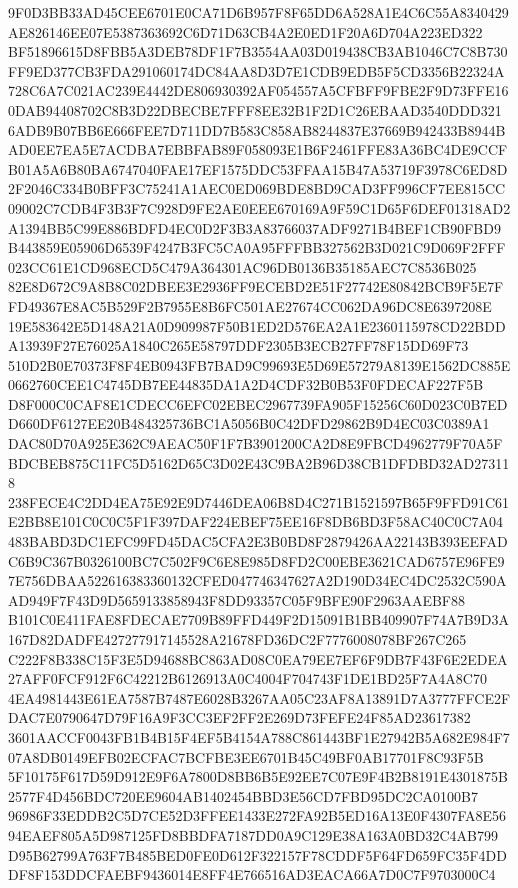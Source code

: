 \documentclass[UTF8,fontset=fandol,zihao=-4,a4paper]{ctexart}
\begin{document}
{{9F0D3BB33AD45CEE6701E0CA71D6B957F8F65DD6A528A1E4C6C55A8340429AE826146EE07E5387363692C6D71D63CB4A2E0ED1F20A6D704A223ED322
BF51896615D8FBB5A3DEB78DF1F7B3554AA03D019438CB3AB1046C7C8B730FF9ED377CB3FDA291060174DC84AA8D3D7E1CDB9EDB5F5CD3356B22324A
728C6A7C021AC239E4442DE806930392AF054557A5CFBFF9FBE2F9D73FFE160DAB94408702C8B3D22DBECBE7FFF8EE32B1F2D1C26EBAAD3540DDD321
6ADB9B07BB6E666FEE7D711DD7B583C858AB8244837E37669B942433B8944BAD0EE7EA5E7ACDBA7EBBFAB89F058093E1B6F2461FFE83A36BC4DE9CCF
B01A5A6B80BA6747040FAE17EF1575DDC53FFAA15B47A53719F3978C6ED8D2F2046C334B0BFF3C75241A1AEC0ED069BDE8BD9CAD3FF996CF7EE815CC
09002C7CDB4F3B3F7C928D9FE2AE0EEE670169A9F59C1D65F6DEF01318AD2A1394BB5C99E886BDFD4EC0D2F3B3A83766037ADF9271B4BEF1CB90FBD9
B443859E05906D6539F4247B3FC5CA0A95FFFBB327562B3D021C9D069F2FFF023CC61E1CD968ECD5C479A364301AC96DB0136B35185AEC7C8536B025
82E8D672C9A8B8C02DBEE3E2936FF9ECEBD2E51F27742E80842BCB9F5E7FFD49367E8AC5B529F2B7955E8B6FC501AE27674CC062DA96DC8E6397208E
19E583642E5D148A21A0D909987F50B1ED2D576EA2A1E2360115978CD22BDDA13939F27E76025A1840C265E58797DDF2305B3ECB27FF78F15DD69F73
510D2B0E70373F8F4EB0943FB7BAD9C99693E5D69E57279A8139E1562DC885E0662760CEE1C4745DB7EE44835DA1A2D4CDF32B0B53F0FDECAF227F5B
D8F000C0CAF8E1CDECC6EFC02EBEC2967739FA905F15256C60D023C0B7EDD660DF6127EE20B484325736BC1A5056B0C42DFD29862B9D4EC03C0389A1
DAC80D70A925E362C9AEAC50F1F7B3901200CA2D8E9FBCD4962779F70A5FBDCBEB875C11FC5D5162D65C3D02E43C9BA2B96D38CB1DFDBD32AD273118
238FECE4C2DD4EA75E92E9D7446DEA06B8D4C271B1521597B65F9FFD91C61E2BB8E101C0C0C5F1F397DAF224EBEF75EE16F8DB6BD3F58AC40C0C7A04
483BABD3DC1EFC99FD45DAC5CFA2E3B0BD8F2879426AA22143B393EEFADC6B9C367B0326100BC7C502F9C6E8E985D8FD2C00EBE3621CAD6757E96FE9
7E756DBAA522616383360132CFED047746347627A2D190D34EC4DC2532C590AAD949F7F43D9D5659133858943F8DD93357C05F9BFE90F2963AAEBF88
B101C0E411FAE8FDECAE7709B89FFD449F2D15091B1BB409907F74A7B9D3A167D82DADFE427277917145528A21678FD36DC2F7776008078BF267C265
C222F8B338C15F3E5D94688BC863AD08C0EA79EE7EF6F9DB7F43F6E2EDEA27AFF0FCF912F6C42212B6126913A0C4004F704743F1DE1BD25F7A4A8C70
4EA4981443E61EA7587B7487E6028B3267AA05C23AF8A13891D7A3777FFCE2FDAC7E0790647D79F16A9F3CC3EF2FF2E269D73FEFE24F85AD23617382
3601AACCF0043FB1B4B15F4EF5B4154A788C861443BF1E27942B5A682E984F707A8DB0149EFB02ECFAC7BCFBE3EE6701B45C49BF0AB17701F8C93F5B
5F10175F617D59D912E9F6A7800D8BB6B5E92EE7C07E9F4B2B8191E4301875B2577F4D456BDC720EE9604AB1402454BBD3E56CD7FBD95DC2CA0100B7
96986F33EDDB2C5D7CE52D3FFEE1433E272FA92B5ED16A13E0F4307FA8E5694EAEF805A5D987125FD8BBDFA7187DD0A9C129E38A163A0BD32C4AB799
D95B62799A763F7B485BED0FE0D612F322157F78CDDF5F64FD659FC35F4DDDF8F153DDCFAEBF9436014E8FF4E766516AD3EACA66A7D0C7F9703000C4
}}
\end{document}
